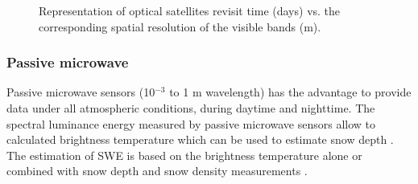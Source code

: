 \documentclass[hydrology,article,submit,moreauthors,pdftex]{Definitions/mdpi}
\begin{document}
\begin{figure}[h]
	\centering
			
	\caption{Representation of optical satellites revisit time (days) vs. the corresponding spatial resolution of the visible bands (m).}\label{sat}
\end{figure}






\subsubsection{Passive microwave}


Passive microwave sensors (10$^{-3}$ to 1 m wavelength) has the advantage to provide data under all atmospheric conditions, during daytime and nighttime.  The spectral luminance energy measured by passive microwave sensors allow to calculated brightness temperature which can be used to estimate snow depth \citep{Chang_1982}. The estimation of SWE is based on the brightness temperature alone or combined with snow depth and snow density measurements \citep{Chang_1987,Cho_2017,Davenport_2012}.
\end{document}
